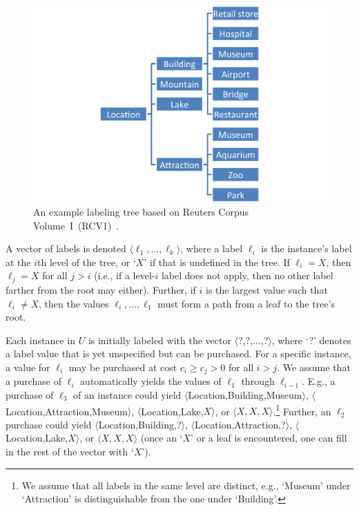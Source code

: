 \documentclass[10pt,conference,compsocconf]{IEEEtran}
\begin{document}
\begin{figure}[ht]
\vskip 0.2in
\begin{center}
\centerline{\includegraphics[width=1.1 \columnwidth]{fig/exp-ontology.png}}
\caption{An example labeling tree based on Reuters Corpus Volume~I~(RCV1)~\cite{Lewis2004}. 
}
\label{fig:ontologyex}
\end{center}
\vskip -0.2in
\end{figure} 

A vector of labels is denoted $\langle \ell_1,\ldots,\ell_k \rangle$, where a
label $\ell_i$ is the instance's label at the $i$th level of the tree, or `$X$' if that is
undefined in the tree.  If $\ell_i=X$, then $\ell_j=X$ for all $j > i$ (i.e., if a level-$i$
label does not apply, then no other label farther from the root may either).
Further, if $i$ is the largest value such that $\ell_i \neq X$, then
the values $\ell_i,\ldots,\ell_1$ must form a path from a leaf to the tree's root. 

Each instance in $U$ is initially labeled with the vector
$\langle$?,?,$\ldots$,?$\rangle$,
where `?' denotes a label value that is yet unspecified but can
be purchased.  For a specific instance, a value for $\ell_i$ may be purchased 
at cost $c_i \ge c_j > 0$ for all $i > j$.  We assume that a purchase of $\ell_i$ automatically
yields the values of $\ell_1$ through $\ell_{i-1}$.  E.g., a purchase of $\ell_3$ of an
instance could yield
$\langle$Location,Building,Museum$\rangle$,  $\langle$Location,Attraction,Museum$\rangle$,
$\langle$Location,Lake,$X\rangle$, or $\langle X,X,X \rangle$.\footnote{We assume that all labels in the
same level are distinct, e.g., `Museum' under `Attraction' is distinguishable from the one under
`Building'.}  %
Further, an $\ell_2$ purchase could yield
$\langle$Location,Building,?$\rangle$,  $\langle$Location,Attraction,?$\rangle$,
$\langle$Location,Lake,$X\rangle$, or $\langle X,X,X \rangle$ (once an `$X$' or a leaf
is encountered, one can fill in the rest of the vector with `$X$').
\end{document}
